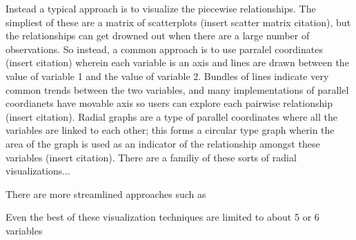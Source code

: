 \documentclass[../main.tex]{subfiles}
\begin{document}
Instead a typical approach is to visualize the piecewise relationships. The
simpliest of these are a matrix of scatterplots (insert scatter matrix
citation), but the relationships can get drowned out when there are a large
number of observations. So instead, a common approach is to use parralel
coordinates (insert citation) wherein each variable is an axis and lines are
drawn between the value of variable 1 and the value of variable 2. Bundles of
lines indicate very common trends between the two variables, and many
implementations of parallel coordianets have movable axis so users can explore
each pairwise relationship (insert citation). Radial graphs are a type of 
parallel coordinates where all the variables are linked to each other; this
forms a circular type graph wherin the area of the graph is used as an
indicator of the relationship amongst these variables (insert citation). There
are a familiy of these sorts of radial visualizations...


There are more streamlined approaches
such as  %




Even the best of these visualization techniques are limited to about 5 or 6 variables



\end{document}
